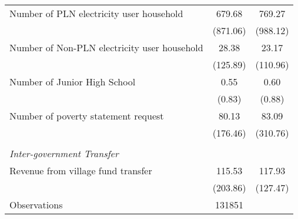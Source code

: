 \begin{tabular}{l*{2}{c}}
\hspace{0.25cm} Number of PLN electricity user household&      679.68&      769.27\\
                    &    (871.06)&    (988.12)\\
\hspace{0.25cm} Number of Non-PLN electricity user household&       28.38&       23.17\\
                    &    (125.89)&    (110.96)\\
\hspace{0.25cm} Number of Junior High School&        0.55&        0.60\\
                    &      (0.83)&      (0.88)\\
\hspace{0.25cm} Number of poverty statement request&       80.13&       83.09\\
                    &    (176.46)&    (310.76)\\
\vspace{0.1em} \\ \emph{Inter-government Transfer}&            &            \\
\hspace{0.25cm} Revenue from village fund transfer&      115.53&      117.93\\
                    &    (203.86)&    (127.47)\\
\hline
Observations        &      131851&            \\
\hline\hline
\end{tabular}

